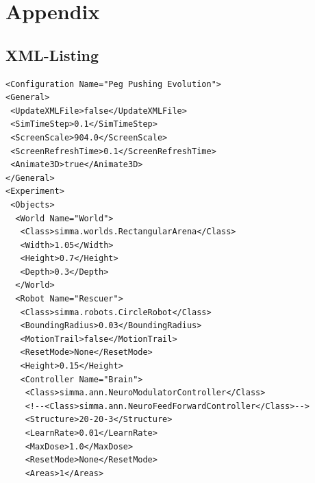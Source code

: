 \documentclass[12pt,fleqn,a4paper]{article}
\begin{document}



\section{Appendix}

\subsection{XML-Listing}

\lstset{language=XML}
\begin{lstlisting}
<Configuration Name="Peg Pushing Evolution">
<General>
 <UpdateXMLFile>false</UpdateXMLFile>
 <SimTimeStep>0.1</SimTimeStep>
 <ScreenScale>904.0</ScreenScale>
 <ScreenRefreshTime>0.1</ScreenRefreshTime>
 <Animate3D>true</Animate3D>
</General>
<Experiment>
 <Objects>
  <World Name="World">
   <Class>simma.worlds.RectangularArena</Class>
   <Width>1.05</Width>
   <Height>0.7</Height>
   <Depth>0.3</Depth>
  </World>
  <Robot Name="Rescuer">
   <Class>simma.robots.CircleRobot</Class>
   <BoundingRadius>0.03</BoundingRadius>
   <MotionTrail>false</MotionTrail>
   <ResetMode>None</ResetMode>
   <Height>0.15</Height>
   <Controller Name="Brain">
    <Class>simma.ann.NeuroModulatorController</Class>
    <!--<Class>simma.ann.NeuroFeedForwardController</Class>-->
    <Structure>20-20-3</Structure>
    <LearnRate>0.01</LearnRate>
    <MaxDose>1.0</MaxDose>
    <ResetMode>None</ResetMode>
    <Areas>1</Areas>
   

\end{lstlisting}
\end{document}
